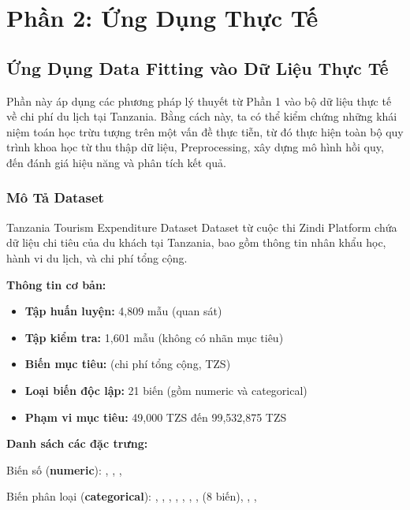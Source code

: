 \section{Phần 2: Ứng Dụng Thực Tế}

\subsection{Ứng Dụng Data Fitting vào Dữ Liệu Thực Tế}

Phần này áp dụng các phương pháp lý thuyết từ Phần 1 vào bộ dữ liệu thực tế về chi phí du lịch tại Tanzania. Bằng cách này, ta có thể kiểm chứng những khái niệm toán học trừu tượng trên một vấn đề thực tiễn, từ đó thực hiện toàn bộ quy trình khoa học từ thu thập dữ liệu, Preprocessing, xây dựng mô hình hồi quy, đến đánh giá hiệu năng và phân tích kết quả.

\subsubsection{Mô Tả Dataset}


\begin{mydef}{Tanzania Tourism Expenditure Dataset}{}
Dataset từ cuộc thi Zindi Platform chứa dữ liệu chi tiêu của du khách tại Tanzania, bao gồm thông tin nhân khẩu học, hành vi du lịch, và chi phí tổng cộng.

\vspace{0.3cm}

\textbf{Thông tin cơ bản:}
\begin{itemize}
    \item \textbf{Tập huấn luyện:} 4,809 mẫu (quan sát)
    \item \textbf{Tập kiểm tra:} 1,601 mẫu (không có nhãn mục tiêu)
    \item \textbf{Biến mục tiêu:}  (chi phí tổng cộng, TZS)
    \item \textbf{Loại biến độc lập:} 21 biến (gồm numeric và categorical)
    \item \textbf{Phạm vi mục tiêu:} 49,000 TZS đến 99,532,875 TZS
\end{itemize}

\vspace{0.3cm}

\textbf{Danh sách các đặc trưng:}

Biến số (\textbf{numeric}): , , , 

Biến phân loại (\textbf{categorical}): , , , , , , ,  (8 biến), , , 
\end{mydef}

